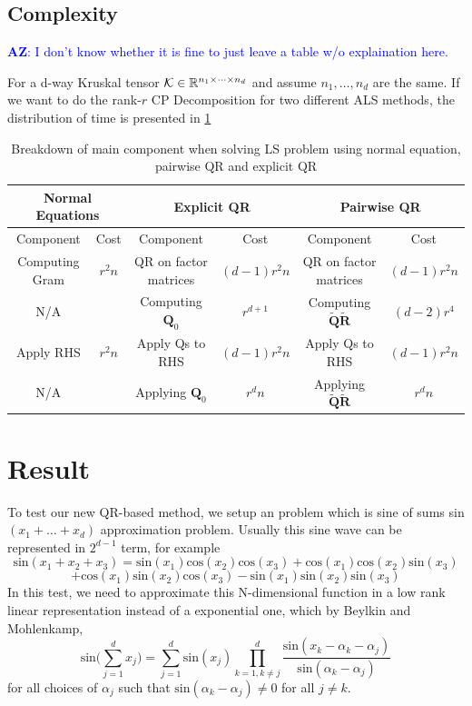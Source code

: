 \documentclass{article}
\newcommand{\mat}[1]{\mathbf{#1}}
\newcommand{\T}[2][]{#1{\mathbf{\cal{#2}}}} 						%
\newcommand{\AZ}[1]{\textcolor{blue}{\textbf{AZ}: #1}}
\begin{document}
\subsection{Complexity}
\AZ{I don't know whether it is fine to just leave a table w/o explaination here.}

For a d-way Kruskal tensor $\T{K} \in \mathbb{R}^{n_1 \times \dots \times n_d}$ and assume $n_1, \dots , n_d$ are the same. 
If we want to do the rank-$r$ CP Decomposition for two different ALS methods, the distribution of time is presented in \cref{tab:its_parts}


\begin{table}[!ht]
  
  \centering
  \begin{tabular}{|c|c|c|c|c|c|}
    \hline
    \multicolumn{2}{|c|}{\textbf{Normal Equations}} & \multicolumn{2}{|c|}{\textbf{Explicit QR}} & \multicolumn{2}{|c|}{\textbf{Pairwise QR}} \\
    \hline
    Component & Cost & Component & Cost & Component & Cost \\
    \hline
    Computing Gram & $r^2n$&QR on factor matrices & $(d-1)r^2n$ & QR on factor matrices & $(d-1)r^2n$\\
    N/A& &Computing $\mat{Q}_0$ & $r^{d+1}$& Computing $\tilde{\mat{Q}}\tilde{\mat{R}}$& $(d-2)r^4$\\
    Apply RHS&  $r^2n$&Apply Qs to RHS & $(d-1)r^2n$ & Apply Qs to RHS& $(d-1)r^2n$ \\
    N/A & &Applying $\mat{Q}_0$& $r^dn$& Applying $\tilde{\mat{Q}}\tilde{\mat{R}}$& $r^dn$\\
     \hline
  \end{tabular}
  \caption{Breakdown of main component when solving LS problem using normal equation, pairwise QR and explicit QR}
  \label{tab:its_parts}
  \end{table}

  




\section{Result}
To test our new QR-based method, we setup an problem which is sine of sums sin$(x_1+\dots+ x_d)$ approximation problem.
Usually this sine wave can be represented in $2^{d-1}$ term, for example
$$\text{sin}(x_1+x_2+x_3) = \text{sin}(x_1)\text{cos}(x_2)\text{cos}(x_3)+\text{cos}(x_1)\text{cos}(x_2)\text{sin}(x_3)$$
$$+\text{cos}(x_1)\text{sin}(x_2)\text{cos}(x_3) - \text{sin}(x_1)\text{sin}(x_2)\text{sin}(x_3)$$
In this test, we need to approximate this N-dimensional function in a low rank linear representation instead of a exponential one, which by Beylkin and Mohlenkamp,
$$\text{sin}\bigl(\sum^d_{j=1}x_j\bigr) = \sum^d_{j=1}\text{sin}(x_j)\prod^d_{k=1,k\neq j}\frac{\text{sin}(x_k - \alpha_k -\alpha_j)}{\text{sin}(\alpha_k - \alpha_j)}$$
for all choices of  ${\alpha_j}$ such that $\text{sin}(\alpha_k - \alpha_j) \neq 0$ for all $j \neq k$.
\end{document}
